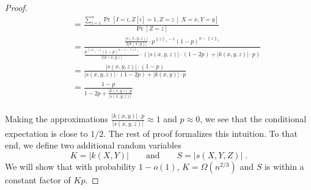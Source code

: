 \documentclass[10pt]{article}
\newcommand{\norm}[1]{\left\| #1 \right\|}
\begin{document}
\begin{proof}
\begin{align*}
& \quad = \frac{\displaystyle \sum_{i=1}^n \Pr \left[ I = i, Z[i] = 1, Z = z \, \middle| \, X = x, Y = y \right]}{\displaystyle \Pr \left[ Z = z \right]} \\
& \quad = \frac{\displaystyle \frac{|s(x,y,z)|}{2|k(x,y)|} \cdot p^{\norm{z}_1 - 1} (1 - p)^{n - \norm{z}_1}}{\displaystyle \frac{p^{\norm{z}_1 - 1} (1 - p)^{n - 1 - \norm{z}_1}}{2|k(x,y)|} \cdot \left( |s(x,y,z)| \cdot (1 - 2p) + |k(x,y,z)| \cdot p \right) } \\
& \quad = \frac{\displaystyle |s(x,y,z)| \cdot (1 - p)}{\displaystyle |s(x,y,z)| \cdot (1 - 2p) + |k(x,y)| \cdot p } \\
& \quad = \frac{\displaystyle 1 - p}{\displaystyle 1 - 2p + \frac{|k(x,y)| \cdot p}{|s(x,y,z)|}} \\
\end{align*}

Making the approximations $\frac{|k(x,y)| \cdot p}{|s(x,y,z)|} \approx 1$ and $p
\approx 0$, we see that the conditional expectation is close to $1/2$. The rest
of proof formalizes this intuition. To that end, we define
two additional random variables
$$
K = |k(X,Y)| \qquad \text{and} \qquad S = |s(X,Y,Z)| \; .
$$
We will show that with probability $1 - o(1)$, $K = \Omega(n^{2/3})$ and $S$ is within a constant factor of $Kp$.


\end{proof}
\end{document}
